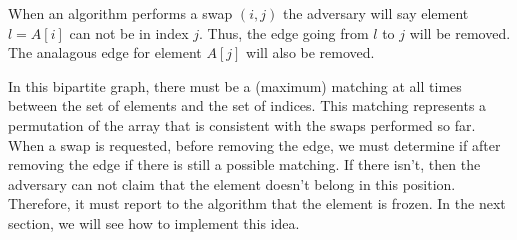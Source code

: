 \documentclass{article}
\begin{document}
When an algorithm performs a swap $(i, j)$ the adversary will say element $l = A[i]$ can not be in index $j$.
Thus, the edge going from $l$ to $j$ will be removed. The analagous edge for element $A[j]$ will also be removed.

In this bipartite graph, there must be a (maximum) matching at all times between the set of elements and the set
of indices. This matching represents a permutation of the array that is consistent with the swaps
performed so far. When a swap is requested, before removing the edge,
we must determine if after removing the edge if there is still a possible matching. If there isn't, then the adversary
can not claim that the element doesn't belong in this position. Therefore, it must report to the algorithm that
the element is frozen. In the next section, we will see how to implement this idea.
\end{document}
